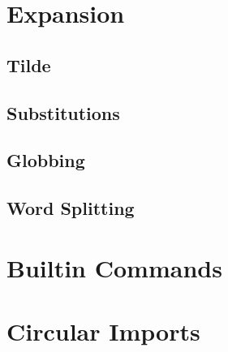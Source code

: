 \section{Expansion}

\subsection{Tilde}
\subsection{Substitutions}
\subsection{Globbing}
\subsection{Word Splitting}

\section{Builtin Commands}

\section{Circular Imports}




